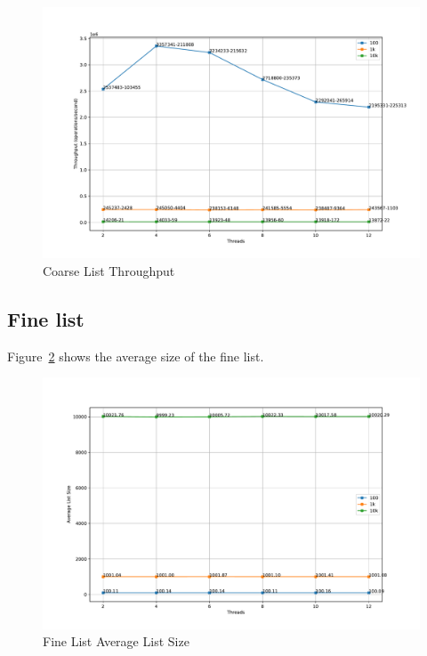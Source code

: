 \documentclass{article}
\begin{document}
\begin{figure}[H]
    \centering
    \includegraphics[width=\textwidth]{../test/plots/CoarseListThroughput.pdf}
    \caption{Coarse List Throughput}
    \label{fig:coarse-throughput}
\end{figure}

\subsection{Fine list}

Figure~\ref{fig:fine-size} shows the average size of the fine list.

\begin{figure}[H]
    \centering
    \includegraphics[scale=0.4]{../test/plots/FineListAverageListSize.pdf}
    \caption{Fine List Average List Size}
    \label{fig:fine-size}
\end{figure}
\end{document}
